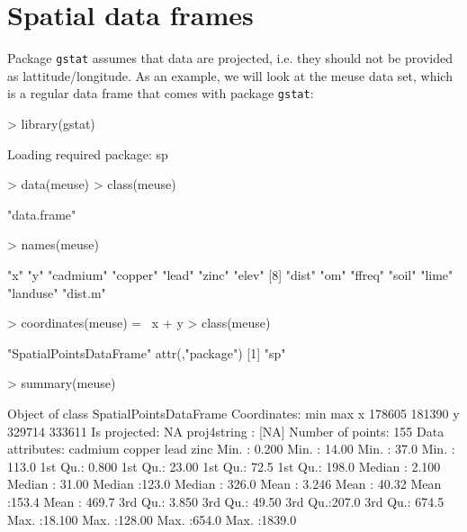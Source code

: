 \documentclass[a4paper]{article}
\newcommand{\code}[1]{{\tt #1}}
\begin{document}
\section{Spatial data frames}
Package \code{gstat} assumes that data are projected, i.e. they should
not be provided as lattitude/longitude. As an example, we will look
at the meuse data set, which is a regular data frame that comes with
package \code{gstat}:

\begin{Schunk}
\begin{Sinput}
> library(gstat)
\end{Sinput}
\begin{Soutput}
Loading required package: sp
\end{Soutput}
\begin{Sinput}
> data(meuse)
> class(meuse)
\end{Sinput}
\begin{Soutput}
[1] "data.frame"
\end{Soutput}
\begin{Sinput}
> names(meuse)
\end{Sinput}
\begin{Soutput}
 [1] "x"       "y"       "cadmium" "copper"  "lead"    "zinc"    "elev"   
 [8] "dist"    "om"      "ffreq"   "soil"    "lime"    "landuse" "dist.m" 
\end{Soutput}
\begin{Sinput}
> coordinates(meuse) = ~x + y
> class(meuse)
\end{Sinput}
\begin{Soutput}
[1] "SpatialPointsDataFrame"
attr(,"package")
[1] "sp"
\end{Soutput}
\begin{Sinput}
> summary(meuse)
\end{Sinput}
\begin{Soutput}
Object of class SpatialPointsDataFrame
Coordinates:
     min    max
x 178605 181390
y 329714 333611
Is projected: NA 
proj4string : [NA]
Number of points: 155
Data attributes:
    cadmium           copper            lead            zinc       
 Min.   : 0.200   Min.   : 14.00   Min.   : 37.0   Min.   : 113.0  
 1st Qu.: 0.800   1st Qu.: 23.00   1st Qu.: 72.5   1st Qu.: 198.0  
 Median : 2.100   Median : 31.00   Median :123.0   Median : 326.0  
 Mean   : 3.246   Mean   : 40.32   Mean   :153.4   Mean   : 469.7  
 3rd Qu.: 3.850   3rd Qu.: 49.50   3rd Qu.:207.0   3rd Qu.: 674.5  
 Max.   :18.100   Max.   :128.00   Max.   :654.0   Max.   :1839.0  
                                                                   

\end{Soutput}
\end{Schunk}
\end{document}
